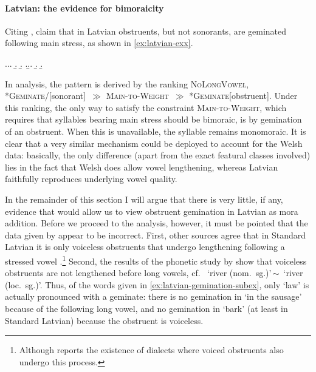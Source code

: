 \paragraph{Latvian: the evidence for bimoraicity}
\label{sec:latv-evid-bimor}

Citing \citet{holst01:_lettis_gramm}, \citet{bye08} claim that in Latvian obstruents, but not sonorants, are geminated following main stress, as shown in \cref{ex:latvian-exx}.

\ex.\label{ex:latvian-exx}\a.\label{ex:latvian-gemination-subex}\a.
\b.
\b.
\z.\b.\a.
\b.
\b.

In  analysis, the pattern is derived by the ranking \textsc{NoLongVowel}, *\textsc{Geminate}/[sonorant]~$\gg$ \textsc{Main-to-Weight}~$\gg$ *\textsc{Geminate}[obstruent]. Under this ranking, the only way to satisfy the constraint \textsc{Main-to-Weight}, which requires that syllables bearing main stress should be bimoraic, is by gemination of an obstruent. When this is unavailable, the syllable remains monomoraic. It is clear that a very similar mechanism could be deployed to account for the Welsh data: basically, the only difference (apart from the exact featural classes involved) lies in the fact that Welsh does allow vowel lengthening, whereas Latvian faithfully reproduces underlying vowel quality.

In the remainder of this section I will argue that there is very little, if any, evidence that would allow us to view obstruent gemination in Latvian as mora addition. Before we proceed to the analysis, however, it must be pointed that the data given by \citet{holst01:_lettis_gramm} appear to be incorrect. First, other sources agree that in Standard Latvian it is only voiceless obstruents that undergo lengthening following a stressed vowel \citep[\egm][]{laua69:_latvies,karins96:_latvian,staltmane06:_latys}.\footnote{Although \citet{karins96:_latvian} reports the existence of dialects where voiced obstruents also undergo this process.} Second, the results of the phonetic study by \citet{karins96:_latvian} show that voiceless obstruents are not lengthened before long vowels, cf.\ \ipa{[ˈupːe]} `river (nom.~sg.)'\,$\sim$\,\ipa{[upeː]} `river (loc.~sg.)'. Thus, of the words given in \cref{ex:latvian-gemination-subex}, only \ipa{[ˈlikːums]} `law' is actually pronounced with a geminate: there is no gemination in \ipa{[dæsɑː]} `in the sausage' because of the following long vowel, and no gemination in \ipa{[ˈmizɑ]} `bark' (at least in Standard Latvian) because the obstruent is voiceless.

